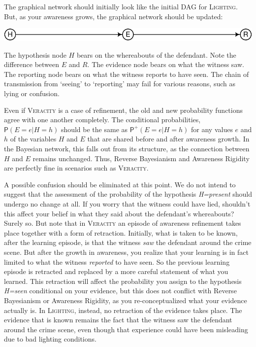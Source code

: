 \documentclass[
  11pt,
  dvipsnames,enabledeprecatedfontcommands]{scrartcl}
\newcommand{\pr}[1]{\ensuremath{\mathsf{P}(#1)}}
\newcommand{\ppr}[2]{\ensuremath{\mathsf{P}^{#1}(#2)}}
\begin{document}
The graphical network should initially look like the initial DAG for
\textsc{Lighting}. But, as your awareness grows, the graphical network
should be updated:

\begin{center}\includegraphics[width=0.5\linewidth,height=0.3\textheight]{ReplyToSteeleStefansson2_files/figure-latex/veracityDAG-1} \end{center}

The hypothesis node \(H\) bears on the whereabouts of the defendant.
Note the difference between \(E\) and \(R\). The evidence node bears on
what the witness saw. The reporting node bears on what the witness
reports to have seen. The chain of transmission from `seeing' to
`reporting' may fail for various reasons, such as lying or confusion.

Even if \textsc{Veracity} is a case of refinement, the old and new
probability functions agree with one another completely. The conditional
probabilities, \(\pr{E=e \vert H=h}\) should be the same as
\(\ppr{+}{E=e \vert H=h}\) for any values \(e\) and \(h\) of the
variables \(H\) and \(E\) that are shared before and after awareness
growth. In the Bayesian network, this falls out from its structure, as
the connection between \(H\) and \(E\) remains unchanged. Thus, Reverse
Bayesianism and Awareness Rigidity are perfectly fine in scenarios such
as \textsc{Veracity}.

A possible confusion should be eliminated at this point. We do not
intend to suggest that the assessment of the probability of the
hypothesis \textit{H=present} should undergo no change at all. If you
worry that the witness could have lied, shouldn't this affect your
belief in what they said about the defendant's whereabouts? Surely so.
But note that in \textsc{Veracity} an episode of awareness refinement
takes place together with a form of retraction. Initially, what is taken
to be known, after the learning episode, is that the witness
\textit{saw} the defendant around the crime scene. But after the growth
in awareness, you realize that your learning is in fact limited to what
the witness \textit{reported} to have seen. So the previous learning
episode is retracted and replaced by a more careful statement of what
you learned. This retraction will affect the probability you assign to
the hypothesis \textit{H=seen} conditional on your evidence, but this
does not conflict with Reverse Bayesianism or Awareness Rigidity, as you
re-conceptualized what your evidence actually is. In \textsc{Lighting},
instead, no retraction of the evidence takes place. The evidence that is
known remains the fact that the witness saw the defendant around the
crime scene, even though that experience could have been misleading due
to bad lighting conditions.
\end{document}
